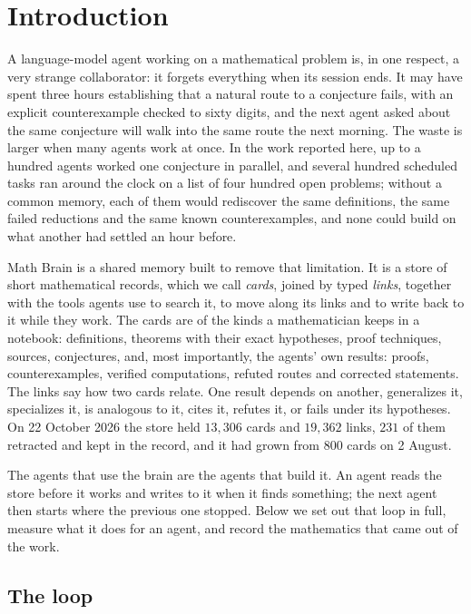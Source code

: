 \section{Introduction}\label{sec:intro}

A language-model agent working on a mathematical problem is, in one respect, a very strange collaborator: it forgets everything when its session ends. It may have spent three hours establishing that a natural route to a conjecture fails, with an explicit counterexample checked to sixty digits, and the next agent asked about the same conjecture will walk into the same route the next morning. The waste is larger when many agents work at once. In the work reported here, up to a hundred agents worked one conjecture in parallel, and several hundred scheduled tasks ran around the clock on a list of four hundred open problems; without a common memory, each of them would rediscover the same definitions, the same failed reductions and the same known counterexamples, and none could build on what another had settled an hour before.

Math Brain is a shared memory built to remove that limitation. It is a store of short mathematical records, which we call \emph{cards}, joined by typed \emph{links}, together with the tools agents use to search it, to move along its links and to write back to it while they work. The cards are of the kinds a mathematician keeps in a notebook: definitions, theorems with their exact hypotheses, proof techniques, sources, conjectures, and, most importantly, the agents' own results: proofs, counterexamples, verified computations, refuted routes and corrected statements. The links say how two cards relate. One result depends on another, generalizes it, specializes it, is analogous to it, cites it, refutes it, or fails under its hypotheses. On 22 October 2026 the store held $13{,}306$ cards and $19{,}362$ links, $231$ of them retracted and kept in the record, and it had grown from $800$ cards on 2 August.

The agents that use the brain are the agents that build it. An agent reads the store before it works and writes to it when it finds something; the next agent then starts where the previous one stopped. Below we set out that loop in full, measure what it does for an agent, and record the mathematics that came out of the work.

\subsection{The loop}

